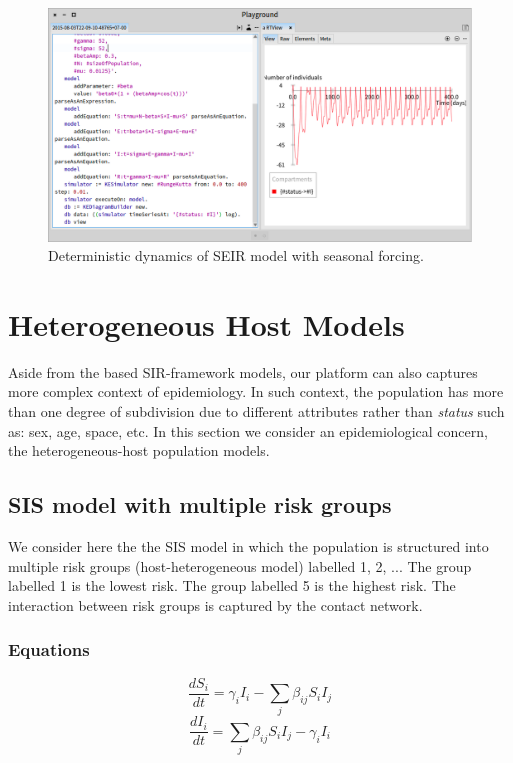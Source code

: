 \documentclass[a4paper,10pt,twoside]{book}
\begin{document}
\begin{figure}

\begin{center}
\includegraphics[width=1.0\textwidth]{figures/SEIR_force.png}\caption{Deterministic dynamics of SEIR model with seasonal forcing.\label{SEIR_force}}\end{center}
\end{figure}

\chapter{ Heterogeneous Host Models}
Aside from the based SIR-framework models, our platform can also captures more complex context of epidemiology.
In such context, the population has more than one degree of subdivision due to different attributes rather than \textit{status} such as: sex, age, space, etc.
In this section we consider an epidemiological concern, the heterogeneous-host population models.
\section{ SIS model with multiple risk groups}
We consider here the the SIS model in which the population is structured into multiple risk groups (host-heterogeneous model) labelled 1, 2, ...
The group labelled 1 is the lowest risk. The group labelled 5 is the highest risk.
The interaction between risk groups is captured by the contact network.
\subsection{ Equations}

  \begin{equation}
    \frac{dS_i}{dt} = \gamma_i I_i - \sum_j \beta_{ij} S_i I_j
  \end{equation}
  \begin{equation}
    \frac{dI_i}{dt} = \sum_j \beta_{ij} S_i I_j - \gamma_i I_i
  \end{equation}
  
\end{document}
